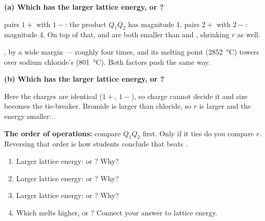 \documentclass{apchem-worksheet}
\begin{document}
\begin{workedexample}
\textbf{(a) Which has the larger lattice energy,  or
?}

 pairs $1+$ with $1-$: the product $Q_1Q_2$ has magnitude 1.
 pairs $2+$ with $2-$: magnitude 4. On top of that, 
and  are both smaller than  and , shrinking $r$
as well.

\textbf{}, by a wide margin --- roughly four times, and its
melting point (\SI{2852}{\celsius}) towers over sodium chloride's
(\SI{801}{\celsius}). Both factors push the same way.

\textbf{(b) Which has the larger lattice energy,  or
?}

Here the charges are identical ($1+$, $1-$), so charge cannot decide it
and size becomes the tie-breaker. Bromide is larger than chloride, so
$r$ is larger and the energy smaller: \textbf{}.

\textbf{The order of operations:} compare $Q_1Q_2$ first. Only if it
ties do you compare $r$. Reversing that order is how students conclude
that  beats .
\end{workedexample}

\begin{yourturn}
\begin{enumerate}[leftmargin=*,itemsep=0.5em]
  \item Larger lattice energy:  or ? Why?
        \workspace[1.4cm]
  \item Larger lattice energy:  or ? Why?
        \workspace[1.4cm]
  \item Larger lattice energy:  or ? Why?
        \workspace[1.4cm]
  \item Which melts higher,  or ? Connect your answer
        to lattice energy. \workspace[1.6cm]
\end{enumerate}
\end{yourturn}
\end{document}
